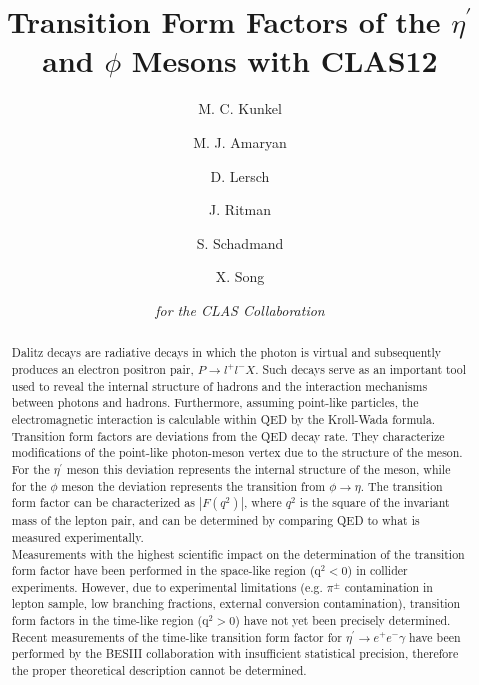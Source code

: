 \documentclass{aip-cp}
\def\etaP{\eta^{\prime}}
\begin{document}
\title{Transition Form Factors of the $\eta^{\prime}$ and $\phi$ Mesons with CLAS12}
\author[aff1]{M. C. Kunkel}
\author[aff2]{M. J. Amaryan}
\author[aff1]{D. Lersch}
\author[aff1]{J. Ritman}
\author[aff1]{S. Schadmand}
\author[aff1]{X. Song}
\author{\textit{for the CLAS Collaboration}}
\maketitle

\begin{abstract}
Dalitz decays are radiative decays in which the photon is virtual and subsequently produces an electron positron pair, $P\rightarrow l^+l^-X$. Such decays serve as an important tool used to reveal the internal structure of hadrons and the interaction mechanisms between photons and hadrons. Furthermore, assuming point-like particles, the electromagnetic interaction is calculable within QED by the Kroll-Wada formula. Transition form factors are deviations from the QED decay rate. They characterize modifications of the point-like photon-meson vertex due to the structure of the meson. For the $\etaP$ meson this deviation represents the internal structure of the meson, while for the $\phi$ meson the deviation represents the transition from $\phi \to \eta$. The transition form factor can be characterized as $\left| F(q^2)\right|$, where $q^2$ is the square of the invariant mass of the lepton pair, and can be determined by comparing QED to what is measured experimentally.
 \\ 
 \indent Measurements with the highest scientific impact on the determination of the transition form factor have been performed in the space-like region ($\mathrm{q}^2<0$) in collider experiments. However, due to experimental limitations (e.g. $\pi^{\pm}$ contamination in lepton sample, low branching fractions, external conversion contamination), transition form factors in the time-like region ($\mathrm{q}^2>0$) have not yet been precisely determined. Recent measurements of the time-like transition form factor for $\etaP \to e^+e^- \gamma$ have been performed by the BESIII collaboration with insufficient statistical precision, therefore the proper theoretical description cannot be determined. 
\\

\end{abstract}
\end{document}
